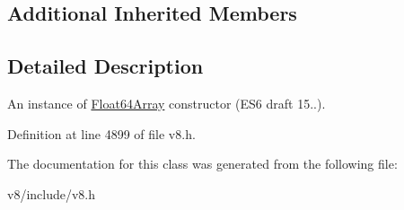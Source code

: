 \subsection*{Additional Inherited Members}


\subsection{Detailed Description}
An instance of \mbox{\hyperlink{classv8_1_1Float64Array}{Float64\+Array}} constructor (E\+S6 draft 15..). 

Definition at line 4899 of file v8.\+h.



The documentation for this class was generated from the following file\+:\begin{DoxyCompactItemize}
\item 
v8/include/v8.\+h\end{DoxyCompactItemize}
